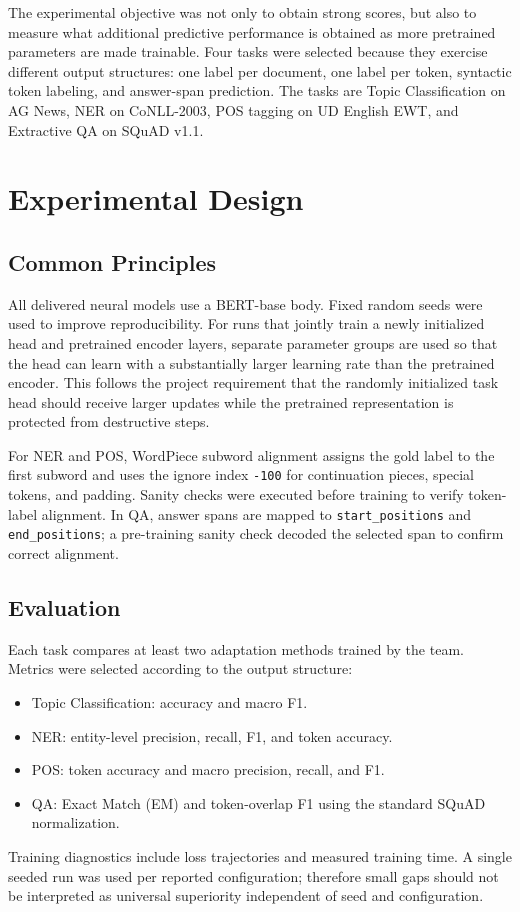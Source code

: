 \documentclass[conference]{IEEEtran}
\begin{document}
The experimental objective was not only to obtain strong scores, but also to measure what additional predictive performance is obtained as more pretrained parameters are made trainable. Four tasks were selected because they exercise different output structures: one label per document, one label per token, syntactic token labeling, and answer-span prediction. The tasks are Topic Classification on AG News, NER on CoNLL-2003, POS tagging on UD English EWT, and Extractive QA on SQuAD v1.1.

\section{Experimental Design}

\subsection{Common Principles}
All delivered neural models use a BERT-base body. Fixed random seeds were used to improve reproducibility. For runs that jointly train a newly initialized head and pretrained encoder layers, separate parameter groups are used so that the head can learn with a substantially larger learning rate than the pretrained encoder. This follows the project requirement that the randomly initialized task head should receive larger updates while the pretrained representation is protected from destructive steps.

For NER and POS, WordPiece subword alignment assigns the gold label to the first subword and uses the ignore index \texttt{-100} for continuation pieces, special tokens, and padding. Sanity checks were executed before training to verify token-label alignment. In QA, answer spans are mapped to \texttt{start\_positions} and \texttt{end\_positions}; a pre-training sanity check decoded the selected span to confirm correct alignment.

\subsection{Evaluation}
Each task compares at least two adaptation methods trained by the team. Metrics were selected according to the output structure:
\begin{itemize}[leftmargin=*]
    \item Topic Classification: accuracy and macro F1.
    \item NER: entity-level precision, recall, F1, and token accuracy.
    \item POS: token accuracy and macro precision, recall, and F1.
    \item QA: Exact Match (EM) and token-overlap F1 using the standard SQuAD normalization.
\end{itemize}
Training diagnostics include loss trajectories and measured training time. A single seeded run was used per reported configuration; therefore small gaps should not be interpreted as universal superiority independent of seed and configuration.
\end{document}
